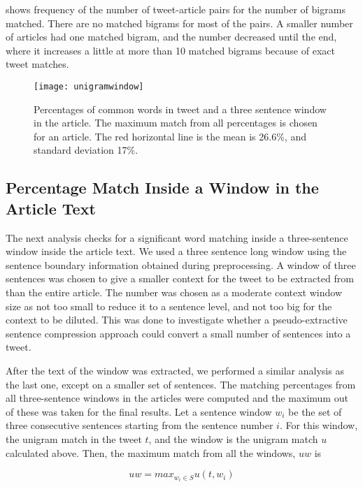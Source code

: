 shows frequency of the number of tweet-article pairs for the number of bigrams matched. There are no matched bigrams for most of the pairs. A smaller number of articles had one matched bigram, and the number decreased until the end, where it increases a little at more than 10 matched bigrams because of exact tweet matches. 



\begin{figure}[tbp]
\centering
\texttt{[image: unigramwindow]}
\caption{Percentages of common words in tweet and a three sentence window in the article. The maximum match from all percentages is chosen for an article. The red horizontal line is the mean is 26.6\%, and standard deviation 17\%.}
\label{fig:unigramwindow}
\end{figure}


\subsection{Percentage Match Inside a Window in the Article Text}
\label{sec:window}

The next analysis checks for a significant word matching inside a three-sentence window inside the article text. We used a three sentence long window using the sentence boundary information obtained during preprocessing. A window of three sentences was chosen to give a smaller context for the tweet to be extracted from than the entire article. The number was chosen as a moderate context window size as not too small to reduce it to a sentence level, and not too big for the context to be diluted. This was done to investigate whether a pseudo-extractive sentence compression approach could convert a small number of sentences into a tweet.

After the text of the window was extracted, we performed a similar analysis as the last one, except on a smaller set of sentences. The matching percentages from all three-sentence windows in the articles were computed and the maximum out of these was taken for the final results. Let a sentence window $w_i$ be the set of three consecutive sentences starting from the sentence number $i$. For this window, the unigram match in the tweet $t$, and the window is the unigram match $u$ calculated above. Then, the maximum match from all the windows, $uw$ is 

\begin{equation}
uw = max_{w_i \in S} u(t, w_i)
\end{equation}

